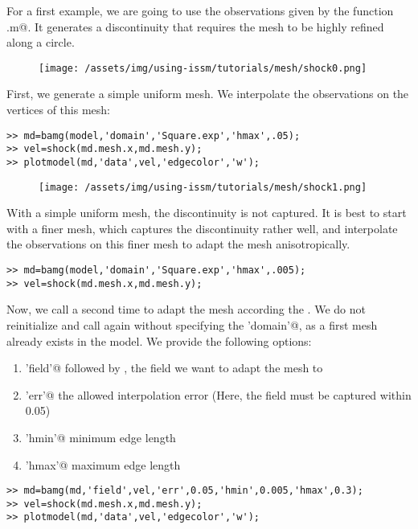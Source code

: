 For a first example, we are going to use the observations given by the function \verb@shock.m@. It generates a discontinuity that requires the mesh to be highly refined along a circle.
\begin{figure}[H]
	\begin{center}
		\texttt{[image: /assets/img/using-issm/tutorials/mesh/shock0.png]}
	\end{center}
\end{figure}
First, we generate a simple uniform mesh. We interpolate the observations on the vertices of this mesh:
\begin{verbatim}>> md=bamg(model,'domain','Square.exp','hmax',.05);
>> vel=shock(md.mesh.x,md.mesh.y);
>> plotmodel(md,'data',vel,'edgecolor','w');
\end{verbatim}
\begin{figure}[H]
	\begin{center}
		\texttt{[image: /assets/img/using-issm/tutorials/mesh/shock1.png]}
	\end{center}
\end{figure}
With a simple uniform mesh, the discontinuity is not captured. It is best to start with a finer mesh, which captures the discontinuity rather well, and interpolate the observations on this finer mesh to adapt the mesh anisotropically.
\begin{verbatim}>> md=bamg(model,'domain','Square.exp','hmax',.005);
>> vel=shock(md.mesh.x,md.mesh.y);
\end{verbatim}
Now, we call \verb@bamg@ a second time to adapt the mesh according the \verb@vel@. We do not reinitialize \verb@md@ and call \verb@bamg@ again without specifying the \verb@'domain'@, as a first mesh already exists in the model. We provide the following options:
\begin{enumerate}
	\item \verb@'field'@ followed by \verb@vel@, the field we want to adapt the mesh to
	\item \verb@'err'@ the allowed interpolation error (Here, the field must be captured within 0.05)
	\item \verb@'hmin'@ minimum edge length
	\item \verb@'hmax'@ maximum edge length
\end{enumerate}
\begin{verbatim}>> md=bamg(md,'field',vel,'err',0.05,'hmin',0.005,'hmax',0.3);
>> vel=shock(md.mesh.x,md.mesh.y);
>> plotmodel(md,'data',vel,'edgecolor','w');
\end{verbatim}

